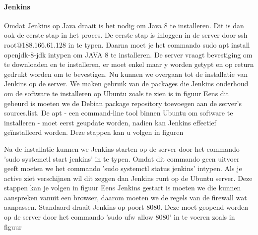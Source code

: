     \paragraph{Jenkins}
    Omdat Jenkins op Java draait is het nodig om Java 8 te installeren. Dit is dan ook de eerste stap in het proces. 
    De eerste stap is inloggen in de server door ssh root@188.166.61.128 in te typen. Daarna moet je het commando sudo apt install openjdk-8-jdk intypen om JAVA 8 te installeren. De server vraagt bevestiging om te downloaden en te installeren, er moet enkel maar y worden getypt en op return gedrukt worden om te bevestigen. %
    Nu kunnen we overgaan tot de installatie van Jenkins op de server. We maken gebruik van de packages die Jenkins onderhoud om de software te installeren op Ubuntu zoals te zien is in figuur %
    Eens dit gebeurd is moeten we de Debian package repository toevoegen aan de server's sources.list.
    De apt - een command-line tool binnen Ubuntu om software te installeren - moet eerst geupdate worden, nadien kan Jenkins effectief geïnstalleerd worden. Deze stappen kan u volgen in figuren %
    
    Na de installatie kunnen we Jenkins starten op de server door het commando 'sudo systemctl start jenkins' in te typen. Omdat dit commando geen uitvoer geeft moeten we het commando 'sudo systemctl status jenkins' intypen. Als je active ziet verschijnen wil dit zeggen dan Jenkins runt op de Ubuntu server. Deze stappen kan je volgen in figuur %
    Eens Jenkins gestart is moeten we die kunnen aanspreken vanuit een browser, daarom moeten we de regels van de firewall wat aanpassen. Standaard draait Jenkins op poort 8080. Deze moet geopend worden op de server door het commando 'sudo ufw allow 8080' in te voeren zoals in figuur %
    
